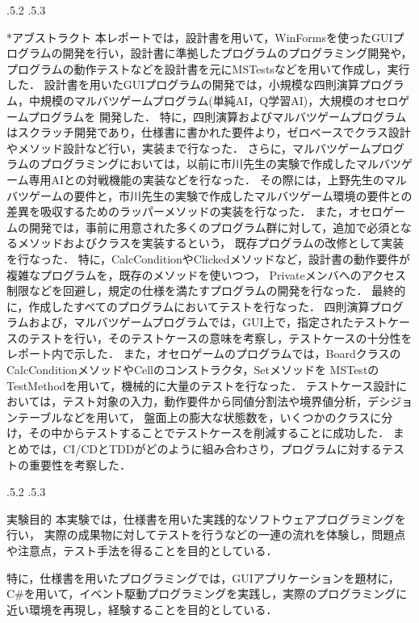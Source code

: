 \documentclass[platex,dvipdfmx,12pt]{jsarticle}
\makeatletter
\renewcommand{\section}{%
\clearpage
\@startsection{section}{1}{\z@}%
{\Cvs \@plus.5\Cdp \@minus.2\Cdp}%
{.5\Cvs \@plus.3\Cdp}%
{\normalfont\LARGE\headfont\raggedright}}%
\makeatother
\begin{document}
\section*{アブストラクト}
\thispagestyle{empty}
本レポートでは，設計書を用いて，WinFormsを使ったGUIプログラムの開発を行い，設計書に準拠したプログラムのプログラミング開発や，プログラムの動作テストなどを設計書を元にMSTestsなどを用いて作成し，実行した．
設計書を用いたGUIプログラムの開発では，小規模な四則演算プログラム，中規模のマルバツゲームプログラム(単純AI，Q学習AI)，大規模のオセロゲームプログラムを
開発した．
特に，四則演算およびマルバツゲームプログラムはスクラッチ開発であり，仕様書に書かれた要件より，ゼロベースでクラス設計やメソッド設計など行い，実装まで行なった．
さらに，マルバツゲームプログラムのプログラミングにおいては，以前に市川先生の実験で作成したマルバツゲーム専用AIとの対戦機能の実装などを行なった．
その際には，上野先生のマルバツゲームの要件と，市川先生の実験で作成したマルバツゲーム環境の要件との差異を吸収するためのラッパーメソッドの実装を行なった．
また，オセロゲームの開発では，事前に用意された多くのプログラム群に対して，追加で必須となるメソッドおよびクラスを実装するという，
既存プログラムの改修として実装を行なった．
特に，CalcConditionやClickedメソッドなど，設計書の動作要件が複雑なプログラムを，既存のメソッドを使いつつ，
Privateメンバへのアクセス制限などを回避し，規定の仕様を満たすプログラムの開発を行なった．
最終的に，作成したすべてのプログラムにおいてテストを行なった．
四則演算プログラムおよび，マルバツゲームプログラムでは，GUI上で，指定されたテストケースのテストを行い，そのテストケースの意味を考察し，テストケースの十分性をレポート内で示した．
また，オセロゲームのプログラムでは，BoardクラスのCalcConditionメソッドやCellのコンストラクタ，Setメソッドを
MSTestのTestMethodを用いて，機械的に大量のテストを行なった．
テストケース設計においては，テスト対象の入力，動作要件から同値分割法や境界値分析，デシジョンテーブルなどを用いて，
盤面上の膨大な状態数を，いくつかのクラスに分け，その中からテストすることでテストケースを削減することに成功した．
まとめでは，CI/CDとTDDがどのように組み合わさり，プログラムに対するテストの重要性を考察した．


\section{実験目的}
\setcounter{page}{1}
本実験では，仕様書を用いた実践的なソフトウェアプログラミングを行い，
実際の成果物に対してテストを行うなどの一連の流れを体験し，問題点や注意点，テスト手法を得ることを目的としている．

特に，仕様書を用いたプログラミングでは，GUIアプリケーションを題材に，C\#を用いて，イベント駆動プログラミングを実践し，実際のプログラミングに近い環境を再現し，経験することを目的としている．
\end{document}
